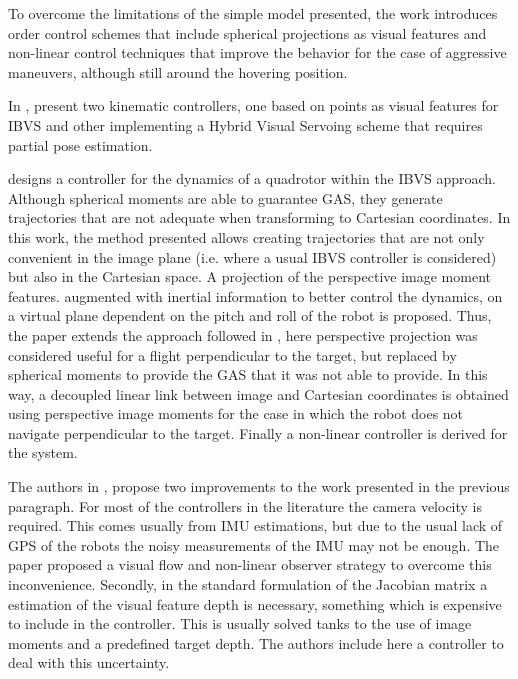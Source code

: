 To overcome the limitations of the simple model presented, the work introduces order control schemes that include spherical projections as visual features and non-linear control techniques that improve the behavior for the case of aggressive maneuvers, although still around the hovering position.
 

 In \cite{ceren_image_2012}, present two kinematic controllers, one based on points as visual features for IBVS and other implementing a Hybrid Visual Servoing scheme that requires partial pose estimation.
  
  
  \cite{jabbari_dynamic_2012} designs a controller for the dynamics of a quadrotor within the IBVS approach. Although spherical moments are able to guarantee GAS, they generate trajectories that are not adequate when transforming to Cartesian coordinates.  In this work, the method presented allows creating trajectories that are not only convenient in the image plane (i.e. where a usual IBVS controller is considered) but also in the Cartesian space. A projection of the perspective image moment features. augmented with inertial information to better control the dynamics, on a virtual plane dependent on the pitch and roll of the robot is proposed. Thus, the paper extends the approach followed in \cite{bourquardez_2009}, here perspective projection was considered useful for a flight perpendicular to the target, but replaced by spherical moments to provide the GAS that it was not able to provide. In this way, a decoupled linear link between image and Cartesian coordinates is obtained using perspective image moments for the case in which the robot does not navigate perpendicular to the target. Finally a non-linear controller is derived for the system.
   
 
 The authors in \cite{asl_vision-based_2015}, propose two improvements to the work presented in the previous paragraph. For most of the controllers in the literature the camera velocity is required. This comes usually from IMU estimations, but due to the usual lack of GPS of the robots the noisy measurements of the IMU may not be enough. The paper proposed a visual flow and non-linear observer strategy to overcome this inconvenience. Secondly, in the standard formulation of the Jacobian matrix a estimation of the visual feature depth is necessary, something which is expensive to include in the controller. This is usually solved tanks to the use of image moments and a predefined target depth. The authors include here a controller to deal with this uncertainty. 
 
